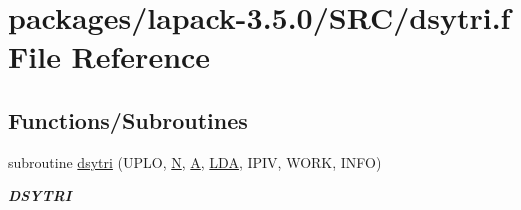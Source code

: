 \hypertarget{dsytri_8f}{}\section{packages/lapack-\/3.5.0/\+S\+R\+C/dsytri.f File Reference}
\label{dsytri_8f}
\subsection*{Functions/\+Subroutines}
\begin{DoxyCompactItemize}
\item 
subroutine \hyperlink{group__doubleSYcomputational_ga75e09b4299b7955044a3bbf84c46b593}{dsytri} (U\+P\+L\+O, \hyperlink{polmisc_8c_a0240ac851181b84ac374872dc5434ee4}{N}, \hyperlink{classA}{A}, \hyperlink{example__user_8c_ae946da542ce0db94dced19b2ecefd1aa}{L\+D\+A}, I\+P\+I\+V, W\+O\+R\+K, I\+N\+F\+O)
\begin{DoxyCompactList}\small\item\em {\bfseries D\+S\+Y\+T\+R\+I} \end{DoxyCompactList}\end{DoxyCompactItemize}
